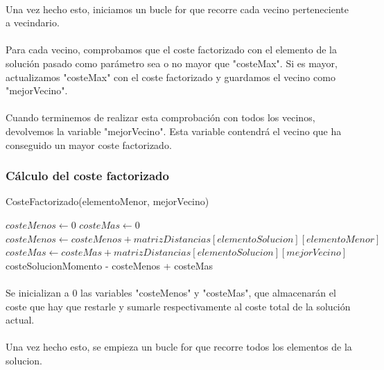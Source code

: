 \documentclass{article}
\begin{document}
	\paragraph{}Una vez hecho esto, iniciamos un bucle for que recorre cada vecino perteneciente a vecindario.
	
	\paragraph{}Para cada vecino, comprobamos que el coste factorizado con el elemento de la solución pasado como parámetro sea o no mayor que "costeMax". Si es mayor, actualizamos "costeMax" con el coste factorizado y guardamos el vecino como "mejorVecino".
	
	\paragraph{}Cuando terminemos de realizar esta comprobación con todos los vecinos, devolvemos la variable "mejorVecino". Esta variable contendrá el vecino que ha conseguido un mayor coste factorizado.
	
	\subsubsection{Cálculo del coste factorizado}
	
	\begin{algorithm}[H]
		\caption{CosteFactorizado(elementoMenor, mejorVecino)}
		\begin{algorithmic}
			\STATE $costeMenos \leftarrow 0$
			\STATE $costeMas \leftarrow 0$
			\STATE $costeMenos \leftarrow costeMenos + matrizDistancias[elementoSolucion][elementoMenor]$
			\STATE $costeMas \leftarrow costeMas+matrizDistancias[elementoSolucion][mejorVecino]$
			\ENDIF
			\ENDFOR
			\RETURN costeSolucionMomento - costeMenos + costeMas	
		\end{algorithmic}
	\end{algorithm}
	
	\paragraph{}Se inicializan a 0 las variables "costeMenos" y "costeMas", que almacenarán el coste que hay que restarle y sumarle respectivamente al coste total de la solución actual.
	
	\paragraph{}Una vez hecho esto, se empieza un bucle for que recorre todos los elementos de la solucion.
	
\end{document}
